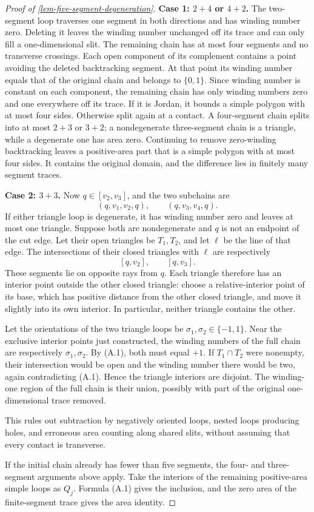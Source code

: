\documentclass[11pt,a4paper]{article}
\theoremstyle{proofmanuscript}
\begin{document}
\begin{proof}[Proof of \ref{lem-five-segment-degeneration}]
\textbf{Case 1: \(2+4\) or \(4+2\).} The two-segment loop traverses one segment in both directions and has winding number zero. Deleting it leaves the winding number unchanged off its trace and can only fill a one-dimensional slit. The remaining chain has at most four segments and no transverse crossings. Each open component of its complement contains a point avoiding the deleted backtracking segment. At that point its winding number equals that of the original chain and belongs to \(\{0,1\}\). Since winding number is constant on each component, the remaining chain has only winding numbers zero and one everywhere off its trace. If it is Jordan, it bounds a simple polygon with at most four sides. Otherwise split again at a contact. A four-segment chain splits into at most \(2+3\) or \(3+2\); a nondegenerate three-segment chain is a triangle, while a degenerate one has area zero. Continuing to remove zero-winding backtracking leaves a positive-area part that is a simple polygon with at most four sides. It contains the original domain, and the difference lies in finitely many segment traces.

\textbf{Case 2: \(3+3\).} Now \(q\in[v_2,v_3]\), and the two subchains are \[
(q,v_1,v_2,q),\qquad(q,v_3,v_4,q).
\] If either triangle loop is degenerate, it has winding number zero and leaves at most one triangle. Suppose both are nondegenerate and \(q\) is not an endpoint of the cut edge. Let their open triangles be \(T_1,T_2\), and let \(\ell\) be the line of that edge. The intersections of their closed triangles with \(\ell\) are respectively \[
[q,v_2],\qquad[q,v_3].
\] These segments lie on opposite rays from \(q\). Each triangle therefore has an interior point outside the other closed triangle: choose a relative-interior point of its base, which has positive distance from the other closed triangle, and move it slightly into its own interior. In particular, neither triangle contains the other.

Let the orientations of the two triangle loops be \(\sigma_1,\sigma_2\in\{-1,1\}\). Near the exclusive interior points just constructed, the winding numbers of the full chain are respectively \(\sigma_1,\sigma_2\). By (A.1), both must equal \(+1\). If \(T_1\cap T_2\) were nonempty, their intersection would be open and the winding number there would be two, again contradicting (A.1). Hence the triangle interiors are disjoint. The winding-one region of the full chain is their union, possibly with part of the original one-dimensional trace removed.

This rules out subtraction by negatively oriented loops, nested loops producing holes, and erroneous area counting along shared slits, without assuming that every contact is transverse.

If the initial chain already has fewer than five segments, the four- and three-segment arguments above apply. Take the interiors of the remaining positive-area simple loops as \(Q_j\). Formula (A.1) gives the inclusion, and the zero area of the finite-segment trace gives the area identity.

\end{proof}
\end{document}
